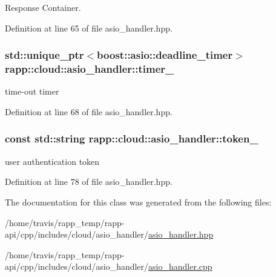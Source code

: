 Response Container. 



Definition at line 65 of file asio\-\_\-handler.\-hpp.

\hypertarget{classrapp_1_1cloud_1_1asio__handler_ad99295ad7fd912df78dcf8955949178a}{
\subsubsection[{timer\-\_\-}]{\setlength{\rightskip}{0pt plus 5cm}std\-::unique\-\_\-ptr$<$boost\-::asio\-::deadline\-\_\-timer$>$ rapp\-::cloud\-::asio\-\_\-handler\-::timer\-\_\-\hspace{0.3cm}{\ttfamily [protected]}}}\label{classrapp_1_1cloud_1_1asio__handler_ad99295ad7fd912df78dcf8955949178a}


time-\/out timer 



Definition at line 68 of file asio\-\_\-handler.\-hpp.

\hypertarget{classrapp_1_1cloud_1_1asio__handler_ad76795ce6386cf5d2f48873defc6148f}{
\subsubsection[{token\-\_\-}]{\setlength{\rightskip}{0pt plus 5cm}const std\-::string rapp\-::cloud\-::asio\-\_\-handler\-::token\-\_\-\hspace{0.3cm}{\ttfamily [protected]}}}\label{classrapp_1_1cloud_1_1asio__handler_ad76795ce6386cf5d2f48873defc6148f}


user authentication token 



Definition at line 78 of file asio\-\_\-handler.\-hpp.



The documentation for this class was generated from the following files\-:\begin{DoxyCompactItemize}
\item 
/home/travis/rapp\-\_\-temp/rapp-\/api/cpp/includes/cloud/asio\-\_\-handler/\hyperlink{asio__handler_8hpp}{asio\-\_\-handler.\-hpp}\item 
/home/travis/rapp\-\_\-temp/rapp-\/api/cpp/includes/cloud/asio\-\_\-handler/\hyperlink{asio__handler_8cpp}{asio\-\_\-handler.\-cpp}\end{DoxyCompactItemize}
